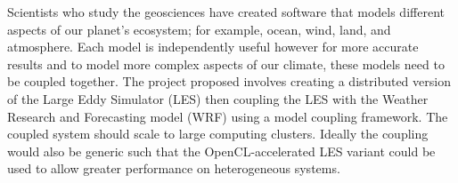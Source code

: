 Scientists who study the geosciences have created software that models different
aspects of our planet's ecosystem; for example, ocean, wind, land, and
atmosphere. Each model is independently useful however for more accurate results
and to model more complex aspects of our climate, these models need to be
coupled together. The project proposed involves creating a distributed version
of the Large Eddy Simulator (LES) then coupling the LES with the Weather
Research and Forecasting model (WRF) using a model coupling framework. The
coupled system should scale to large computing clusters. Ideally the coupling
would also be generic such that the OpenCL-accelerated LES variant could be used
to allow greater performance on heterogeneous systems.
